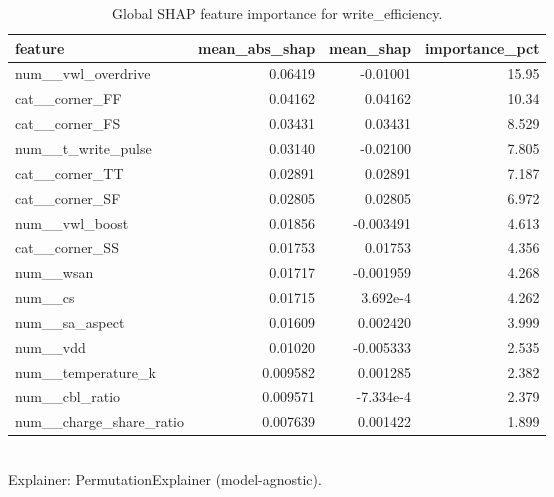 \begin{table}[!t]
\centering
\caption{Global SHAP feature importance for write_efficiency.}
\label{tab:xai_shap_importance_write_efficiency}
\footnotesize
\begin{tabular}{lrrr}
\toprule
feature & mean\_abs\_shap & mean\_shap & importance\_pct \\
\midrule
num\_\_vwl\_overdrive & 0.06419 & -0.01001 & 15.95 \\
cat\_\_corner\_FF & 0.04162 & 0.04162 & 10.34 \\
cat\_\_corner\_FS & 0.03431 & 0.03431 & 8.529 \\
num\_\_t\_write\_pulse & 0.03140 & -0.02100 & 7.805 \\
cat\_\_corner\_TT & 0.02891 & 0.02891 & 7.187 \\
cat\_\_corner\_SF & 0.02805 & 0.02805 & 6.972 \\
num\_\_vwl\_boost & 0.01856 & -0.003491 & 4.613 \\
cat\_\_corner\_SS & 0.01753 & 0.01753 & 4.356 \\
num\_\_wsan & 0.01717 & -0.001959 & 4.268 \\
num\_\_cs & 0.01715 & 3.692e-4 & 4.262 \\
num\_\_sa\_aspect & 0.01609 & 0.002420 & 3.999 \\
num\_\_vdd & 0.01020 & -0.005333 & 2.535 \\
num\_\_temperature\_k & 0.009582 & 0.001285 & 2.382 \\
num\_\_cbl\_ratio & 0.009571 & -7.334e-4 & 2.379 \\
num\_\_charge\_share\_ratio & 0.007639 & 0.001422 & 1.899 \\
\bottomrule
\end{tabular}
\\[2pt] \footnotesize Explainer: PermutationExplainer (model-agnostic).
\end{table}
